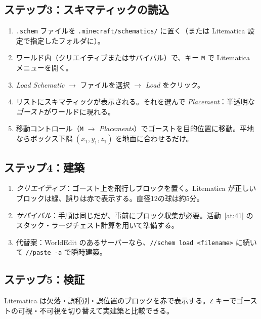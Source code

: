 \documentclass[12pt,a4paper]{scrartcl}
\newcommand{\cmd}[1]{\textcolor{earth}{\texttt{\small #1}}}
\begin{document}
\subsection{ステップ3：スキマティックの読込}
\begin{enumerate}[leftmargin=1.5em,itemsep=0.15em,topsep=0.3em]
  \item \texttt{.schem} ファイルを \texttt{.minecraft/schematics/} に置く（または Litematica 設定で指定したフォルダに）。
  \item ワールド内（クリエイティブまたはサバイバル）で、キー \texttt{M} で Litematica メニューを開く。
  \item \emph{Load Schematic} $\rightarrow$ ファイルを選択 $\rightarrow$ \emph{Load} をクリック。
  \item リストにスキマティックが表示される。それを選んで \emph{Placement}：半透明な\emph{ゴースト}がワールドに現れる。
  \item 移動コントロール（\texttt{M} $\rightarrow$ \emph{Placements}）でゴーストを目的位置に移動。平地ならボックス下隅 $(x_1, y_1, z_1)$ を地面に合わせるだけ。
\end{enumerate}

\subsection{ステップ4：建築}
\begin{enumerate}[leftmargin=1.5em,itemsep=0.15em,topsep=0.3em]
  \item \emph{クリエイティブ}：ゴースト上を飛行しブロックを置く。Litematica が正しいブロックは緑、誤りは赤で表示する。直径12の球は約5分。
  \item \emph{サバイバル}：手順は同じだが、事前にブロック収集が必要。活動~\ref{at:41} のスタック・ラージチェスト計算を用いて準備する。
  \item 代替案：WorldEdit のあるサーバーなら、\cmd{//schem load <filename>} に続いて \cmd{//paste -a} で瞬時建築。
\end{enumerate}

\subsection{ステップ5：検証}
Litematica は欠落・誤種別・誤位置のブロックを赤で表示する。\texttt{Z} キーでゴーストの可視・不可視を切り替えて実建築と比較できる。
\end{document}
